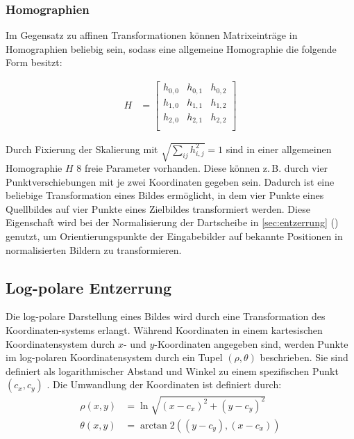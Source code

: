 \newpage
\subsubsection{Homographien}
\label{sec:homographien}

Im Gegensatz zu affinen Transformationen können Matrixeinträge in Homographien beliebig sein, sodass eine allgemeine Homographie die folgende Form besitzt:

\begin{align*}
    H & =
    \left[
        \begin{array}{ccc}
            h_{0, 0} & h_{0, 1} & h_{0, 2} \\
            h_{1, 0} & h_{1, 1} & h_{1, 2} \\
            h_{2, 0} & h_{2, 1} & h_{2, 2} \\
        \end{array}
        \right]
\end{align*}

Durch Fixierung der Skalierung mit $\sqrt{\sum_{ij} h_{i, j}^2} = 1$ sind in einer allgemeinen Homographie $H$ 8 freie Parameter vorhanden. Diese können z.\,B. durch vier Punktverschiebungen mit je zwei Koordinaten gegeben sein. Dadurch ist eine beliebige Transformation eines Bildes ermöglicht, in dem vier Punkte eines Quellbildes auf vier Punkte eines Zielbildes transformiert werden. Diese Eigenschaft wird bei der Normalisierung der Dartscheibe in \autoref{sec:entzerrung} () genutzt, um Orientierungspunkte der Eingabebilder auf bekannte Positionen in normalisierten Bildern zu transformieren.


\subsection{Log-polare Entzerrung}
\label{sec:logpolare_entzerrung}

Die log-polare Darstellung eines Bildes wird durch eine Transformation des Koordinaten-systems erlangt. Während Koordinaten in einem kartesischen Koordinatensystem durch $x$- und $y$-Koordinaten angegeben sind, werden Punkte im log-polaren Koordinatensystem durch ein Tupel $\left(\rho, \theta\right)$ beschrieben. Sie sind definiert als logarithmischer Abstand und Winkel zu einem spezifischen Punkt $\left(c_x, c_y\right)$ \cite{logpolar}. Die Umwandlung der Koordinaten ist definiert durch:
\begin{align*}
    \rho(x, y)   & = \ln \sqrt{(x - c_x)^ 2 + (y - c_y)^2}      \\
    \theta(x, y) & = \arctan2 \left((y - c_y), (x - c_x)\right)
\end{align*}

